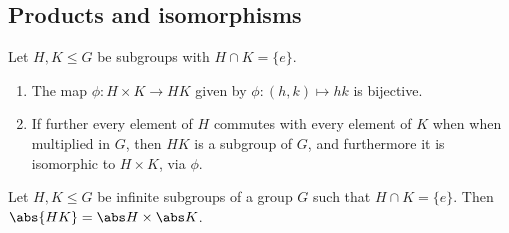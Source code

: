 \documentclass{article}
\begin{document}
\subsection{Products and isomorphisms}

\begin{theorem}
    Let $H,K\leq G$ be subgroups with $H\cap K=\{e\}$.
    \begin{enumerate}
        \item The map $\phi:H\times K\to HK$ given by $\phi:(h,k)\mapsto hk$ is bijective.
        \item If further every element of $H$ commutes with every element of $K$ when
              when multiplied in $G$, then $HK$ is a subgroup of $G$, and
              furthermore it is isomorphic to $H\times K$, via $\phi$.
    \end{enumerate}
\end{theorem}

\begin{corollary}
    Let $H,K\leq G$ be infinite subgroups of a group $G$ such that
    $H\cap K=\{e\}$. Then $\abs{HK} = \abs H \times \abs K$.
\end{corollary}
\end{document}
